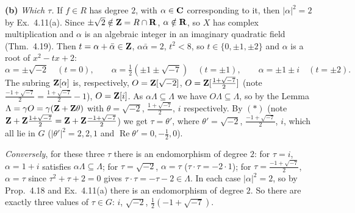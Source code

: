 \documentclass[11pt]{article}
\begin{document}
\textbf{(b)} \emph{Which $\tau$.} If $f\in R$ has degree $2$, with $\alpha\in\mathbf C$ corresponding to it, then $|\alpha|^2=2$ by Ex.~4.11(a). Since $\pm\sqrt2\notin\mathbf Z=R\cap\mathbf R$, $\alpha\notin\mathbf R$, so $X$ has complex multiplication and $\alpha$ is an algebraic integer in an imaginary quadratic field (Thm.~4.19). Then $t=\alpha+\bar\alpha\in\mathbf Z$, $\alpha\bar\alpha=2$, $t^2<8$, so $t\in\{0,\pm1,\pm2\}$ and $\alpha$ is a root of $x^2-tx+2$:
\[
\alpha=\pm\sqrt{-2}\quad(t=0),\qquad \alpha=\tfrac12(\pm1\pm\sqrt{-7})\quad(t=\pm1),\qquad\alpha=\pm1\pm i\quad(t=\pm2).
\]
The subring $\mathbf Z[\alpha]$ is, respectively, $O=\mathbf Z[\sqrt{-2}]$, $O=\mathbf Z[\frac{1+\sqrt{-7}}2]$ (note $\frac{-1+\sqrt{-7}}2=\frac{1+\sqrt{-7}}2-1$), $O=\mathbf Z[i]$. As $\alpha\Lambda\subseteq\Lambda$ we have $O\Lambda\subseteq\Lambda$, so by the Lemma $\Lambda=\gamma O=\gamma(\mathbf Z+\mathbf Z\theta)$ with $\theta=\sqrt{-2}$, $\frac{1+\sqrt{-7}}2$, $i$ respectively. By $(\ast)$ (note $\mathbf Z+\mathbf Z\frac{1+\sqrt{-7}}2=\mathbf Z+\mathbf Z\frac{-1+\sqrt{-7}}2$) we get $\tau=\theta'$, where $\theta'=\sqrt{-2}$, $\frac{-1+\sqrt{-7}}2$, $i$, which all lie in $G$ ($|\theta'|^2=2,2,1$ and $\operatorname{Re}\theta'=0,-\frac12,0$).

\emph{Conversely}, for these three $\tau$ there is an endomorphism of degree $2$: for $\tau=i$, $\alpha=1+i$ satisfies $\alpha\Lambda\subseteq\Lambda$; for $\tau=\sqrt{-2}$, $\alpha=\tau$ ($\tau\cdot\tau=-2\cdot1$); for $\tau=\frac{-1+\sqrt{-7}}2$, $\alpha=\tau$ since $\tau^2+\tau+2=0$ gives $\tau\cdot\tau=-\tau-2\in\Lambda$. In each case $|\alpha|^2=2$, so by Prop.~4.18 and Ex.~4.11(a) there is an endomorphism of degree $2$. So there are exactly three values of $\tau\in G$: $i$, $\sqrt{-2}$, $\frac12(-1+\sqrt{-7})$.
\end{document}
